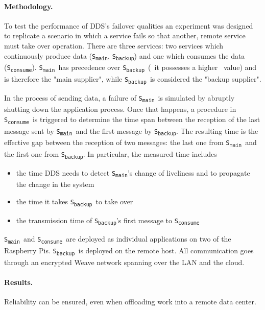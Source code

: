 \newcommand{\proda}{\texttt{S\textsubscript{main}}}
\newcommand{\prodb}{\texttt{S\textsubscript{backup}}}
\newcommand{\cons}{\texttt{S\textsubscript{consume}}}

\paragraph{Methodology.} To test the performance of DDS's failover qualities an experiment was designed to replicate a scenario in which a service fails so that another, remote service must take over operation. There are three services: two services which continuously produce data (\proda , \prodb) and one which consumes the data (\cons). \proda\ has precedence over \prodb\ (\ie\ it possesses a higher \ownership\ value) and is therefore the "main supplier", while \prodb\ is considered the "backup supplier". 

In the process of sending data, a failure of \proda\ is simulated by abruptly shutting down the application process. Once that happens, a procedure in \cons\ is triggered to determine the time span between the reception of the last message sent by \proda\ and the first message by \prodb . The resulting time is the effective gap between the reception of two messages: the last one from \proda\ and the first one from \prodb . In particular, the measured time includes
\begin{itemize}
  \item the time DDS needs to detect \proda 's change of liveliness and to propagate the change in the system
  \item the time it takes \prodb\ to take over
  \item the transmission time of \prodb 's first message to \cons
\end{itemize} 

\proda\ and \cons\ are deployed as individual applications on two of the Raspberry Pis. \prodb\ is deployed on the remote host. All communication goes through an encrypted Weave network spanning over the LAN and the cloud.



\paragraph{Results.} Reliability can be ensured, even when offloading work into a remote data center.

